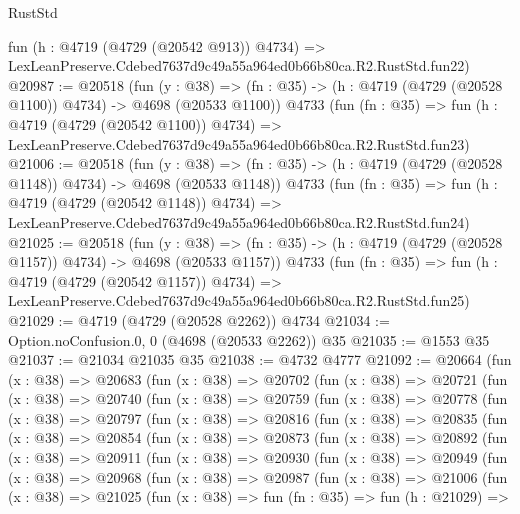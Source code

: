 \begin{lexlean}{RustStd}
\begin{coremodule}
    fun (h : @4719 (@4729 (@20542 @913)) @4734) =>
    LexLeanPreserve.Cdebed7637d9c49a55a964ed0b66b80ca.R2.RustStd.fun22)
@20987 := @20518
    (fun (y : @38) =>
    (fn : @35) -> (h : @4719 (@4729 (@20528 @1100)) @4734) -> @4698 (@20533 @1100))
    @4733
    (fun (fn : @35) =>
    fun (h : @4719 (@4729 (@20542 @1100)) @4734) =>
    LexLeanPreserve.Cdebed7637d9c49a55a964ed0b66b80ca.R2.RustStd.fun23)
@21006 := @20518
    (fun (y : @38) =>
    (fn : @35) -> (h : @4719 (@4729 (@20528 @1148)) @4734) -> @4698 (@20533 @1148))
    @4733
    (fun (fn : @35) =>
    fun (h : @4719 (@4729 (@20542 @1148)) @4734) =>
    LexLeanPreserve.Cdebed7637d9c49a55a964ed0b66b80ca.R2.RustStd.fun24)
@21025 := @20518
    (fun (y : @38) =>
    (fn : @35) -> (h : @4719 (@4729 (@20528 @1157)) @4734) -> @4698 (@20533 @1157))
    @4733
    (fun (fn : @35) =>
    fun (h : @4719 (@4729 (@20542 @1157)) @4734) =>
    LexLeanPreserve.Cdebed7637d9c49a55a964ed0b66b80ca.R2.RustStd.fun25)
@21029 := @4719 (@4729 (@20528 @2262)) @4734
@21034 := Option.noConfusion.{0, 0} (@4698 (@20533 @2262)) @35
@21035 := @1553 @35
@21037 := @21034 @21035 @35
@21038 := @4732 @4777
@21092 := @20664
    (fun (x : @38) =>
    @20683
      (fun (x : @38) =>
      @20702
        (fun (x : @38) =>
        @20721
          (fun (x : @38) =>
          @20740
            (fun (x : @38) =>
            @20759
              (fun (x : @38) =>
              @20778
                (fun (x : @38) =>
                @20797
                  (fun (x : @38) =>
                  @20816
                    (fun (x : @38) =>
                    @20835
                      (fun (x : @38) =>
                      @20854
                        (fun (x : @38) =>
                        @20873
                          (fun (x : @38) =>
                          @20892
                            (fun (x : @38) =>
                            @20911
                              (fun (x : @38) =>
                              @20930
                                (fun (x : @38) =>
                                @20949
                                  (fun (x : @38) =>
                                  @20968
                                    (fun (x : @38) =>
                                    @20987
                                      (fun (x : @38) =>
                                      @21006
                                        (fun (x : @38) =>
                                        @21025
                                          (fun (x : @38) =>
                                          fun (fn : @35) =>
                                          fun (h : @21029) =>

\end{coremodule}
\end{lexlean}
